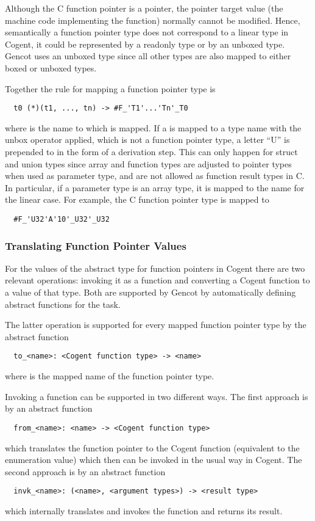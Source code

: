 Although the C function pointer is a pointer, the pointer target value (the machine code implementing the function) 
normally cannot be modified. Hence, semantically a function pointer type does not correspond to a linear type
in Cogent, it could be represented by a readonly type or by an unboxed type. Gencot uses an unboxed type
since all other types are also mapped to either boxed or unboxed types. 

Together the rule for mapping a function pointer type is
\begin{verbatim}
  t0 (*)(t1, ..., tn) -> #F_'T1'...'Tn'_T0
\end{verbatim}
where  is the name to which  is mapped.
If a  is mapped to a type name with the unbox operator applied, which is not a function pointer type,
a letter ``U'' is prepended to  in the form of a derivation step. This can only happen for struct and union types
since array and function types are adjusted to pointer types when used as parameter type, and are not allowed as 
function result types in C. In particular, if a parameter type  is an array type, it is mapped to
the name for the linear case. For example, the C function pointer type  is mapped to
\begin{verbatim}
  #F_'U32'A'10'_U32'_U32
\end{verbatim}

\subsubsection{Translating Function Pointer Values}

For the values of the abstract type for function pointers in Cogent there are two relevant operations: invoking
it as a function and converting a Cogent function to a value of that type. Both are supported by Gencot
by automatically defining abstract functions for the task.

The latter operation is supported for every mapped function pointer type by the abstract function
\begin{verbatim}
  to_<name>: <Cogent function type> -> <name>
\end{verbatim}
where  is the mapped name of the function pointer type.

Invoking a function can be supported in two different ways. The first approach is by an abstract function
\begin{verbatim}
  from_<name>: <name> -> <Cogent function type>
\end{verbatim}
which translates the function pointer to the Cogent function (equivalent to the enumeration value) which
then can be invoked in the usual way in Cogent. The second approach is by an abstract function 
\begin{verbatim}
  invk_<name>: (<name>, <argument types>) -> <result type>
\end{verbatim}
which internally translates and invokes the function and returns its result.

